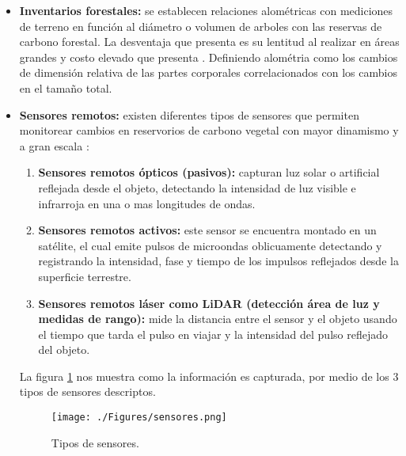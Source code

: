 \begin{itemize}
	
	\item \textbf{Inventarios forestales:} se establecen relaciones alom\'etricas con mediciones de terreno en funci\'on al di\'ametro o volumen de arboles con las reservas de carbono forestal. La desventaja que presenta es su lentitud al realizar en \'areas grandes y costo elevado que presenta \cite{asner2005selective}. Definiendo alom\'etria como los cambios de dimensi\'on relativa de las partes corporales correlacionados con los cambios en el tama\~{n}o total. 
	\item \textbf{Sensores remotos:} existen diferentes tipos de sensores que permiten monitorear cambios en reservorios de carbono vegetal con mayor dinamismo y a gran escala \cite{libro2012Tsuyuki}:
	\begin{enumerate}
	\item \textbf{Sensores remotos \'opticos (pasivos):} capturan luz solar o artificial reflejada desde el objeto, detectando la intensidad de luz visible e infrarroja en una o mas longitudes de ondas.
	\item  \textbf{Sensores remotos activos:} este sensor se encuentra montado en un sat\'elite, el cual emite pulsos de microondas oblicuamente detectando y registrando la intensidad, fase y tiempo de los impulsos reflejados desde la superficie terrestre.
	\item  \textbf{Sensores remotos l\'aser como LiDAR (detecci\'on \'area de luz y medidas de rango):} mide la distancia entre el sensor y el objeto usando el tiempo que tarda el pulso en viajar y la intensidad del pulso reflejado del objeto.
	\end{enumerate}
	La figura \ref{fig:sensores} nos muestra como la informaci\'on es capturada, por medio de los 3 tipos de sensores descriptos.  
	    \begin{figure}[!hbtp]
	    	\centering
	    	\texttt{[image: ./Figures/sensores.png]}
	    	\caption{Tipos de sensores.}
	    	\label{fig:sensores}
	    \end{figure}
\end{itemize}

